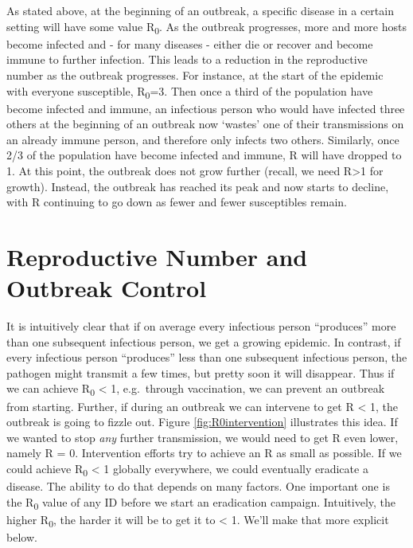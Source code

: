 \documentclass[]{book}
\theoremstyle{definition}
\theoremstyle{definition}
\theoremstyle{definition}
\theoremstyle{remark}
\begin{document}
As stated above, at the beginning of an outbreak, a specific disease in
a certain setting will have some value R\textsubscript{0}. As the
outbreak progresses, more and more hosts become infected and - for many
diseases - either die or recover and become immune to further infection.
This leads to a reduction in the reproductive number as the outbreak
progresses. For instance, at the start of the epidemic with everyone
susceptible, R\textsubscript{0}=3. Then once a third of the population
have become infected and immune, an infectious person who would have
infected three others at the beginning of an outbreak now `wastes' one
of their transmissions on an already immune person, and therefore only
infects two others. Similarly, once 2/3 of the population have become
infected and immune, R will have dropped to 1. At this point, the
outbreak does not grow further (recall, we need R\textgreater{}1 for
growth). Instead, the outbreak has reached its peak and now starts to
decline, with R continuing to go down as fewer and fewer susceptibles
remain.

\section{Reproductive Number and Outbreak
Control}\label{reproductive-number-and-outbreak-control}

It is intuitively clear that if on average every infectious person
``produces'' more than one subsequent infectious person, we get a
growing epidemic. In contrast, if every infectious person ``produces''
less than one subsequent infectious person, the pathogen might transmit
a few times, but pretty soon it will disappear. Thus if we can achieve
R\textsubscript{0} \textless{} 1, e.g.~through vaccination, we can
prevent an outbreak from starting. Further, if during an outbreak we can
intervene to get R \textless{} 1, the outbreak is going to fizzle out.
Figure \ref{fig:R0intervention} illustrates this idea. If we wanted to
stop \emph{any} further transmission, we would need to get R even lower,
namely R = 0. Intervention efforts try to achieve an R as small as
possible. If we could achieve R\textsubscript{0} \textless{} 1 globally
everywhere, we could eventually eradicate a disease. The ability to do
that depends on many factors. One important one is the
R\textsubscript{0} value of any ID before we start an eradication
campaign. Intuitively, the higher R\textsubscript{0}, the harder it will
be to get it to \textless{} 1. We'll make that more explicit below.
\end{document}

